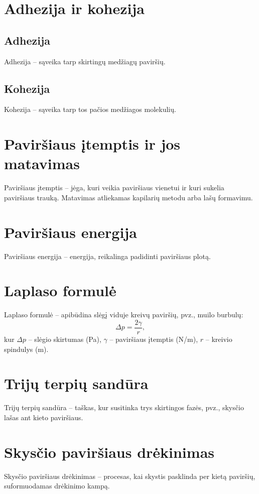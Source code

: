 \documentclass[a4paper,12pt]{article}
\begin{document}
\section{Adhezija ir kohezija}

\subsection{Adhezija}
Adhezija – sąveika tarp skirtingų medžiagų paviršių.

\subsection{Kohezija}
Kohezija – sąveika tarp tos pačios medžiagos molekulių.

\section{Paviršiaus įtemptis ir jos matavimas}
Paviršiaus įtemptis – jėga, kuri veikia paviršiaus vienetui ir kuri sukelia paviršiaus trauką. Matavimas atliekamas kapilarių metodu arba lašų formavimu.

\section{Paviršiaus energija}
Paviršiaus energija – energija, reikalinga padidinti paviršiaus plotą.

\section{Laplaso formulė}
Laplaso formulė – apibūdina slėgį viduje kreivų paviršių, pvz., muilo burbulų:
\[
\Delta p = \frac{2\gamma}{r},
\]
kur $\Delta p$ – slėgio skirtumas (Pa), $\gamma$ – paviršiaus įtemptis (N/m), $r$ – kreivio spindulys (m).

\section{Trijų terpių sandūra}
Trijų terpių sandūra – taškas, kur susitinka trys skirtingos fazės, pvz., skysčio lašas ant kieto paviršiaus.

\section{Skysčio paviršiaus drėkinimas}
Skysčio paviršiaus drėkinimas – procesas, kai skystis pasklinda per kietą paviršių, suformuodamas drėkinimo kampą.
\end{document}
